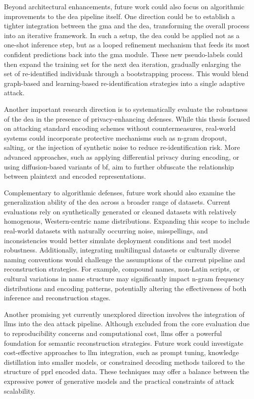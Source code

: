 Beyond architectural enhancements, future work could also focus on algorithmic improvements to the \ac{dea} pipeline itself.
One direction could be to establish a tighter integration between the \ac{gma} and the \ac{dea}, transforming the overall process into an iterative framework.
In such a setup, the \ac{dea} could be applied not as a one-shot inference step, but as a looped refinement mechanism that feeds its most confident predictions back into the \ac{gma} module.
These new pseudo-labels could then expand the training set for the next \ac{dea} iteration, gradually enlarging the set of re-identified individuals through a bootstrapping process.
This would blend graph-based and learning-based re-identification strategies into a single adaptive attack.

Another important research direction is to systematically evaluate the robustness of the \ac{dea} in the presence of privacy-enhancing defenses.
While this thesis focused on attacking standard encoding schemes without countermeasures, real-world systems could incorporate protective mechanisms such as n-gram dropout, salting, or the injection of synthetic noise to reduce re-identification risk.
More advanced approaches, such as applying differential privacy during encoding, or using diffusion-based variants of \ac{bf}, aim to further obfuscate the relationship between plaintext and encoded representations.

Complementary to algorithmic defenses, future work should also examine the generalization ability of the \ac{dea} across a broader range of datasets.
Current evaluations rely on synthetically generated or cleaned datasets with relatively homogenous, Western-centric name distributions.
Expanding this scope to include real-world datasets with naturally occurring noise, misspellings, and inconsistencies would better simulate deployment conditions and test model robustness.
Additionally, integrating multilingual datasets or culturally diverse naming conventions would challenge the assumptions of the current pipeline and reconstruction strategies.
For example, compound names, non-Latin scripts, or cultural variations in name structure may significantly impact n-gram frequency distributions and encoding patterns, potentially altering the effectiveness of both inference and reconstruction stages.

Another promising yet currently unexplored direction involves the integration of \ac{llm}s into the \ac{dea} attack pipeline.
Although excluded from the core evaluation due to reproducibility concerns and computational cost, \ac{llm}s offer a powerful foundation for semantic reconstruction strategies.
Future work could investigate cost-effective approaches to \ac{llm} integration, such as prompt tuning, knowledge distillation into smaller models, or constrained decoding methods tailored to the structure of \ac{pprl} encoded data.
These techniques may offer a balance between the expressive power of generative models and the practical constraints of attack scalability.

